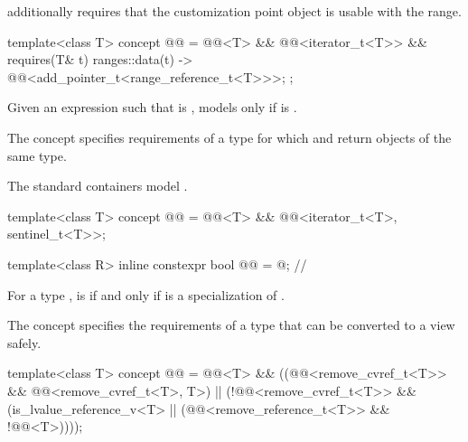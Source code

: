 \pnum
{} additionally requires that
the  customization point object
is usable with the range.

\begin{itemdecl}
template<class T>
  concept @@ =
    @@<T> && @@<iterator_t<T>> &&
    requires(T& t) {
      { ranges::data(t) } -> @@<add_pointer_t<range_reference_t<T>>>;
    };
\end{itemdecl}

\pnum
Given an expression  such that  is ,
 models  only if
is .

\pnum
The  concept specifies requirements of
a  type for which  and
 return objects of the same type.
\begin{example}
The standard containers model .
\end{example}

\begin{itemdecl}
template<class T>
  concept @@ =
    @@<T> && @@<iterator_t<T>, sentinel_t<T>>;
\end{itemdecl}

\begin{itemdecl}
template<class R>
  inline constexpr bool @@ = @\seebelow@;        // \expos
\end{itemdecl}

\begin{itemdescr}
\pnum
For a type ,
 is  if and only if
 is a specialization of .
\end{itemdescr}

\pnum
The  concept specifies the requirements of a
 type that can be converted to a view safely.

\begin{itemdecl}
template<class T>
  concept @@ =
    @@<T> &&
    ((@@<remove_cvref_t<T>> && @@<remove_cvref_t<T>, T>) ||
     (!@@<remove_cvref_t<T>> &&
      (is_lvalue_reference_v<T> || (@@<remove_reference_t<T>> && !@@<T>))));
\end{itemdecl}

